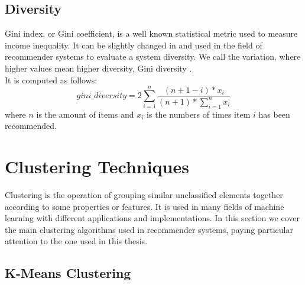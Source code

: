 \subsection{Diversity}

Gini index, or Gini coefficient, is a well known statistical metric used to measure income inequality. It can be slightly changed in and used in the field of recommender systems to evaluate a system diversity. We call the variation, where higher values mean higher diversity, Gini diversity \cite{Diversity}.\\
It is computed as follows:
\[ gini\_diversity = 2 \sum_{i=1}^{n} \frac{(n + 1 - i) * x_i}{(n + 1) * \sum_{i=1}^{n} x_i} \]
where $n$ is the amount of items and $x_i$ is the numbers of times item $i$ has been recommended.



\section{Clustering Techniques}

Clustering is the operation of grouping similar unclassified elements together according to some properties or features. It is used in many fields of machine learning with different applications and implementations. In this section we cover the main clustering algorithms used in recommender systems, paying particular attention to the one used in this thesis.


\subsection{K-Means Clustering}

